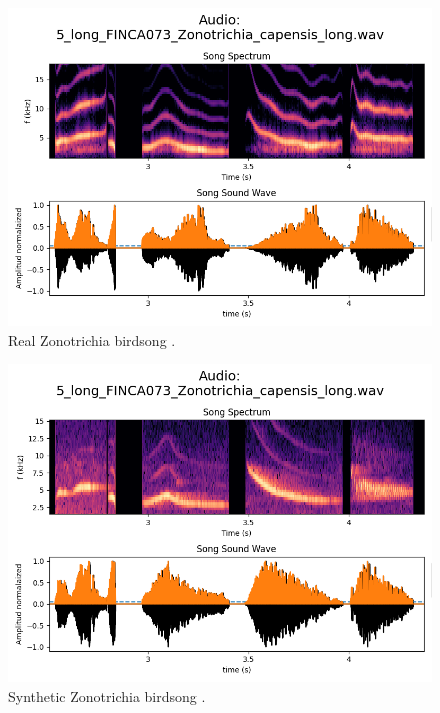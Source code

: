 \begin{figure}[H]
    \centering
    \includegraphics[width=\linewidth]{Images/Figure 23.png}
    \caption{Real Zonotrichia birdsong .}
    \label{fig:birdsong_real}
\end{figure}

\begin{figure}[H]
    \centering
    \includegraphics[width=\linewidth]{Images/Figure 26.png}
    \caption{Synthetic Zonotrichia birdsong .}
    \label{fig:birdsong_real}
\end{figure}




